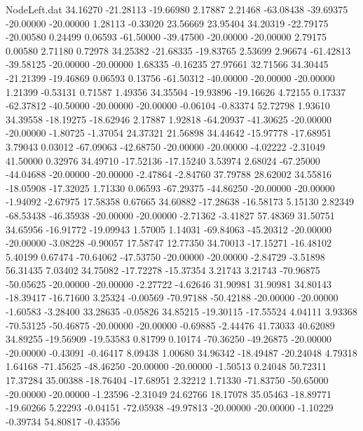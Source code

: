 \begin{filecontents}{NodeLeft.dat}
  34.16270  -21.28113  -19.66980     2.17887    2.21468  -63.08438  -39.69375  -20.00000  -20.00000    1.28113   -0.33020   23.56669   23.95404
  34.20319  -22.79175  -20.00580     0.24499    0.06593  -61.50000  -39.47500  -20.00000  -20.00000    2.79175    0.00580    2.71180    0.72978
  34.25382  -21.68335  -19.83765     2.53699    2.96674  -61.42813  -39.58125  -20.00000  -20.00000    1.68335   -0.16235   27.97661   32.71566
  34.30445  -21.21399  -19.46869     0.06593    0.13756  -61.50312  -40.00000  -20.00000  -20.00000    1.21399   -0.53131    0.71587    1.49356
  34.35504  -19.93896  -19.16626     4.72155    0.17337  -62.37812  -40.50000  -20.00000  -20.00000   -0.06104   -0.83374   52.72798    1.93610
  34.39558  -18.19275  -18.62946     2.17887    1.92818  -64.20937  -41.30625  -20.00000  -20.00000   -1.80725   -1.37054   24.37321   21.56898
  34.44642  -15.97778  -17.68951     3.79043    0.03012  -67.09063  -42.68750  -20.00000  -20.00000   -4.02222   -2.31049   41.50000    0.32976
  34.49710  -17.52136  -17.15240     3.53974    2.68024  -67.25000  -44.04688  -20.00000  -20.00000   -2.47864   -2.84760   37.79788   28.62002
  34.55816  -18.05908  -17.32025     1.71330    0.06593  -67.29375  -44.86250  -20.00000  -20.00000   -1.94092   -2.67975   17.58358    0.67665
  34.60882  -17.28638  -16.58173     5.15130    2.82349  -68.53438  -46.35938  -20.00000  -20.00000   -2.71362   -3.41827   57.48369   31.50751
  34.65956  -16.91772  -19.09943     1.57005    1.14031  -69.84063  -45.20312  -20.00000  -20.00000   -3.08228   -0.90057   17.58747   12.77350
  34.70013  -17.15271  -16.48102     5.40199    0.67474  -70.64062  -47.53750  -20.00000  -20.00000   -2.84729   -3.51898   56.31435    7.03402
  34.75082  -17.72278  -15.37354     3.21743    3.21743  -70.96875  -50.05625  -20.00000  -20.00000   -2.27722   -4.62646   31.90981   31.90981
  34.80143  -18.39417  -16.71600     3.25324   -0.00569  -70.97188  -50.42188  -20.00000  -20.00000   -1.60583   -3.28400   33.28635   -0.05826
  34.85215  -19.30115  -17.55524     4.04111    3.93368  -70.53125  -50.46875  -20.00000  -20.00000   -0.69885   -2.44476   41.73033   40.62089
  34.89255  -19.56909  -19.53583     0.81799    0.10174  -70.36250  -49.26875  -20.00000  -20.00000   -0.43091   -0.46417    8.09438    1.00680
  34.96342  -18.49487  -20.24048     4.79318    1.64168  -71.45625  -48.46250  -20.00000  -20.00000   -1.50513    0.24048   50.72311   17.37284
  35.00388  -18.76404  -17.68951     2.32212    1.71330  -71.83750  -50.65000  -20.00000  -20.00000   -1.23596   -2.31049   24.62766   18.17078
  35.05463  -18.89771  -19.60266     5.22293   -0.04151  -72.05938  -49.97813  -20.00000  -20.00000   -1.10229   -0.39734   54.80817   -0.43556

\end{filecontents}
